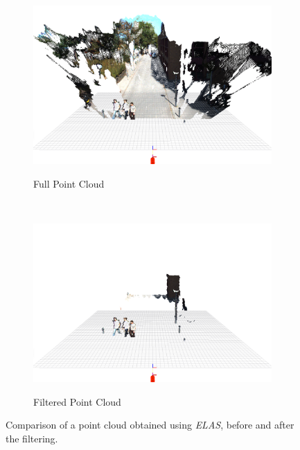 \begin{figure}[t]
        \centering
        \begin{subfigure}[b]{0.475\textwidth}
                \centering
                \caption{Full Point Cloud}
                \includegraphics[width=\textwidth]{fullPointCloud}\label{fig:cp05_full_pointcloud}
        \end{subfigure}%
        ~ 
        \begin{subfigure}[b]{0.475\textwidth}
                \centering
                \caption{Filtered Point Cloud}
                \includegraphics[width=\textwidth]{filteredPointCloud}\label{fig:cp05_filtered_pointcloud}                
        \end{subfigure}%
        \caption{Comparison of a point cloud obtained using \emph{ELAS}, before and after the filtering.}\label{fig:cp05_full_filtered_pointcloud}
\end{figure}

